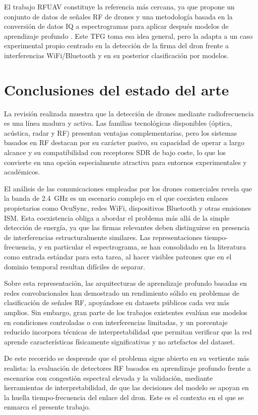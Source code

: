 El trabajo RFUAV constituye la referencia más cercana, ya que propone un conjunto de datos de señales RF de drones y una metodología basada en la conversión de datos IQ a espectrogramas para aplicar después modelos de aprendizaje profundo \cite{rfuav2025}. Este TFG toma esa idea general, pero la adapta a un caso experimental propio centrado en la detección de la firma del dron frente a interferencias WiFi/Bluetooth y en su posterior clasificación por modelos.



\section{Conclusiones del estado del arte}
\label{sec:conclusiones_estado_arte}

La revisión realizada muestra que la detección de drones mediante radiofrecuencia es una línea madura y activa. Las familias tecnológicas disponibles (óptica, acústica, radar y RF) presentan ventajas complementarias, pero los sistemas basados en RF destacan por su carácter pasivo, su capacidad de operar a largo alcance y su compatibilidad con receptores SDR de bajo coste, lo que los convierte en una opción especialmente atractiva para entornos experimentales y académicos.

El análisis de las comunicaciones empleadas por los drones comerciales revela que la banda de \SI{2.4}{\giga\hertz} es un escenario complejo en el que coexisten enlaces propietarios como OcuSync, redes WiFi, dispositivos Bluetooth y otras emisiones ISM. Esta coexistencia obliga a abordar el problema más allá de la simple detección de energía, ya que las firmas relevantes deben distinguirse en presencia de interferencias estructuralmente similares. Las representaciones tiempo-frecuencia, y en particular el espectrograma, se han consolidado en la literatura como entrada estándar para esta tarea, al hacer visibles patrones que en el dominio temporal resultan difíciles de separar.

Sobre esta representación, las arquitecturas de aprendizaje profundo basadas en redes convolucionales han demostrado un rendimiento sólido en problemas de clasificación de señales RF, apoyándose en datasets públicos cada vez más amplios. Sin embargo, gran parte de los trabajos existentes evalúan sus modelos en condiciones controladas o con interferencias limitadas, y un porcentaje reducido incorpora técnicas de interpretabilidad que permitan verificar que la red aprende características físicamente significativas y no artefactos del dataset.

De este recorrido se desprende que el problema sigue abierto en su vertiente más realista: la evaluación de detectores RF basados en aprendizaje profundo frente a escenarios con congestión espectral elevada y la validación, mediante herramientas de interpretabilidad, de que las decisiones del modelo se apoyan en la huella tiempo-frecuencia del enlace del dron. Este es el contexto en el que se enmarca el presente trabajo.